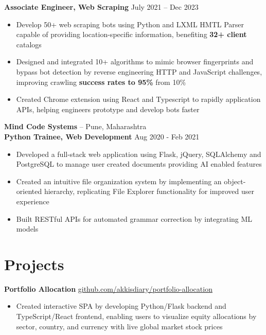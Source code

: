 \documentclass[11pt]{article}       %
\begin{document}
\vspace{-5pt}
\textbf{Associate Engineer, Web Scraping} \hfill July 2021 -- Dec 2023 \\
\vspace{-9pt}
\begin{itemize}
  \item Develop 50+ web scraping bots using Python and LXML HMTL Parser capable of providing location-specific information, benefiting \textbf{32+ client} catalogs \\ 
  \item Designed and integrated 10+ algorithms to mimic browser fingerprints and bypass bot detection by reverse engineering HTTP and JavaScript challenges, improving crawling \textbf{success rates to 95\%} from 10\% \\
  \item Created Chrome extension using React and Typescript to rapidly application APIs, helping engineers prototype and develop bots faster \\
\end{itemize}

\textbf {Mind Code Systems} -- Pune, Maharashtra \\
\textbf{Python Trainee, Web Development} \hfill Aug 2020 - Feb 2021 \\
\vspace{-9pt}
\begin{itemize}
  \item Developed a full-stack web application using Flask, jQuery, SQLAlchemy and PostgreSQL to manage user created documents providing AI enabled features \\
  \item Created an intuitive file organization system by implementing an object-oriented hierarchy, replicating File Explorer functionality for improved user experience \\
  \item Built RESTful APIs for automated grammar correction by integrating ML models \\
\end{itemize}

\vspace{-18.5pt}

\section*{Projects}
\textbf{Portfolio Allocation} \hfill \href{https://github.com/Akkisdiary/portfolio-allocation}{github.com/akkisdiary/portfolio-allocation} \\
\vspace{-9pt}
\begin{itemize}
  \item Created interactive SPA by developing Python/Flask backend and TypeScript/React frontend, enabling users to visualize equity allocations by sector, country, and currency with live global market stock prices \\
\end{itemize}
\end{document}
